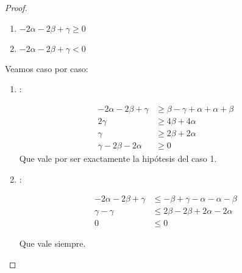 \begin{proof}
    \begin{enumerate}
      \item $-2\alpha-2\beta+\gamma \geq 0$
      \item $-2\alpha-2\beta+\gamma < 0$
    \end{enumerate}
    Veamos caso por caso:
    \begin{enumerate}
      \item {}:

        \begin{equation*}
          \begin{aligned}
          -2\alpha-2\beta+\gamma &\geq \beta - \gamma + \alpha + \alpha + \beta \\
           2\gamma &\geq 4\beta + 4\alpha \\
           \gamma &\geq 2\beta + 2\alpha \\
           \gamma - 2\beta - 2\alpha& \geq 0
          \end{aligned}
        \end{equation*}
        Que vale por ser exactamente la hipótesis del caso 1.

      \item {}:

        \begin{equation*}
          \begin{aligned}
           -2\alpha-2\beta+\gamma &\leq -\beta+\gamma-\alpha-\alpha-\beta \\
           \gamma - \gamma &\leq 2\beta - 2\beta + 2\alpha - 2\alpha \\
           0 &\leq 0
          \end{aligned}
        \end{equation*}

        Que vale siempre.

    \end{enumerate}


  \end{proof}


